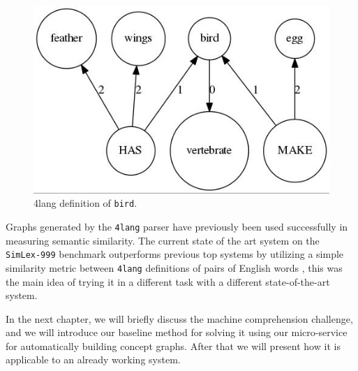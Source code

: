 \begin{figure}[!htb]
	\centering
	\includegraphics[scale=0.5]{figures/bird}
	\caption{4lang definition of \texttt{bird}.}
	\label{fig:bird}
\end{figure}

Graphs generated by the \texttt{4lang} parser have previously been used
successfully in measuring semantic similarity. The current state of the
art system on the \texttt{SimLex-999} benchmark \cite{Hill:2014a}
outperforms previous top systems by utilizing a simple similarity metric
between \texttt{4lang} definitions of pairs of English words
\cite{Recski:2016c}, this was the main idea of trying it in a different task with a different state-of-the-art system.

In the next chapter, we will briefly discuss the machine comprehension challenge, and we will introduce our baseline method for solving it using our micro-service for automatically building concept graphs. After that we will present how it is applicable to an already working system.